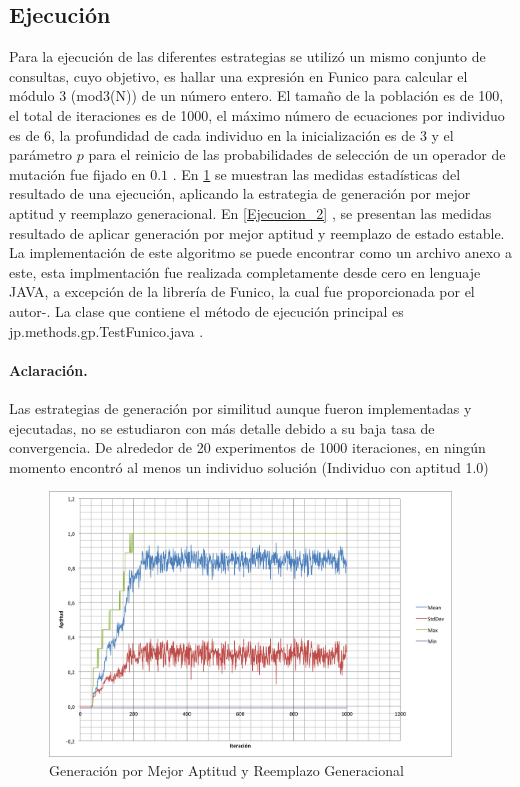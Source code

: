 \documentclass{llncs}
\begin{document}
\subsection{Ejecución}
Para la ejecución de las diferentes estrategias se utilizó un mismo conjunto de consultas, cuyo objetivo, es hallar una expresión en Funico para calcular el módulo 3 (mod3(N)) de un número entero.
El tamaño de la población es de 100, el total de iteraciones es de 1000, el máximo número de ecuaciones por individuo es de 6, la profundidad de cada individuo en la inicialización es de 3 y el parámetro $p$ para el reinicio de las probabilidades de selección de un operador de mutación fue fijado en $0.1$ .
En \ref{Ejecucion_1} se muestran las medidas estadísticas del resultado de una ejecución, aplicando la estrategia de generación por mejor aptitud y reemplazo generacional. En \ref{Ejecucion_2} , se presentan las medidas resultado de aplicar generación por mejor aptitud y reemplazo de estado estable. La implementación de este algoritmo se puede encontrar como un archivo anexo a este, esta implmentación fue realizada completamente desde cero en lenguaje JAVA, a excepción de la librería de Funico, la cual fue proporcionada por el autor-\cite{cub:gom}. La clase que contiene el método de ejecución principal es jp.methods.gp.TestFunico.java .

\paragraph{Aclaración.}
Las estrategias de generación por similitud aunque fueron implementadas y ejecutadas, no se estudiaron con más detalle debido a su baja tasa de convergencia. De alrededor de 20 experimentos de 1000 iteraciones, en ningún momento encontró al menos un individuo solución (Individuo con aptitud 1.0)

\begin{figure}
  \centering
    \includegraphics[width=0.95\textwidth]{GPBestFitGen}
  \caption{Generación por Mejor Aptitud  y Reemplazo Generacional}
  \label{Ejecucion_1}
\end{figure}
\end{document}
